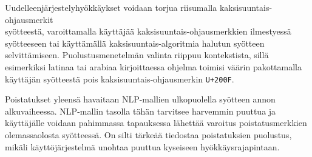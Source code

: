 Uudelleenjärjestelyhyökkäykset voidaan torjua riisumalla kaksisuuntais-ohjausmerkit\\syötteestä, varoittamalla käyttäjää kaksisuuntais-ohjausmerkkien ilmestyessä syötteeseen tai käyttämällä kaksisuuntais-algoritmia halutun syötteen selvittämiseen. Puolustusmenetelmän valinta riippuu kontekstista, sillä esimerkiksi latinaa tai arabiaa kirjoittaessa ohjelma toimisi väärin pakottamalla käyttäjän syötteestä pois kaksisuuntais-ohjausmerkin \texttt{U+200F}. \citep{boucher2021bad}

Poistatukset yleensä havaitaan NLP-mallien ulkopuolella syötteen annon alkuvaiheessa. NLP-mallin tasolla tähän tarvitsee harvemmin puuttua ja käyttäjälle voidaan pahimmassa tapauksessa lähettää varoitus poistatusmerkkien olemassaolosta syötteessä. On silti tärkeää tiedostaa poistatuksien puolustus, mikäli käyttöjärjestelmä unohtaa puuttua kyseiseen hyökkäysrajapintaan. \citep{boucher2021bad}